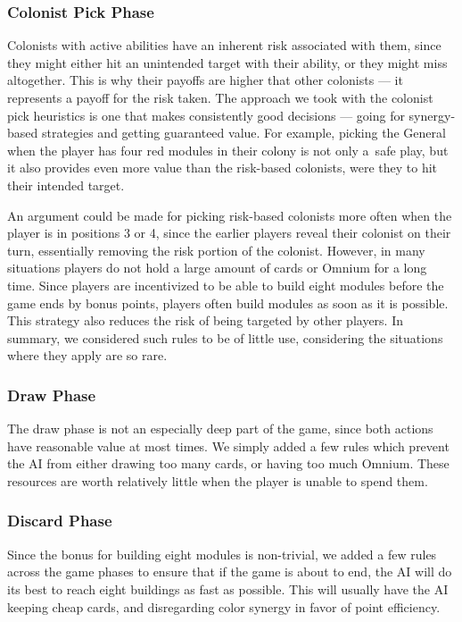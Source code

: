 \subsubsection{Colonist Pick Phase}

Colonists with active abilities have an inherent risk associated with them,
since they might either hit an unintended target with their ability, or they might
miss altogether. This is why their payoffs are higher that other colonists ---
it represents a payoff for the risk taken.
The approach we took with the colonist pick heuristics is one that makes consistently
good decisions --- going for synergy-based strategies and getting guaranteed value.
For example, picking the General when the player has four red modules in their colony
is not only a~safe play, but it also provides even more value than the risk-based
colonists, were they to hit their intended target.

An argument could be made for picking risk-based colonists more often when the player
is in positions 3 or 4, since the earlier players reveal their colonist on their turn,
essentially removing the risk portion of the colonist. However, in many situations players
do not hold a large amount of cards or Omnium for a long time. Since players are incentivized
to be able to build eight modules before the game ends by bonus points, players often
build modules as soon as it is possible. This strategy also reduces the risk of being
targeted by other players. In summary, we considered such rules to be of little use,
considering the situations where they apply are so rare.

\subsubsection{Draw Phase}

The draw phase is not an especially deep part of the game, since both actions have
reasonable value at most times. We simply added a few rules which prevent the AI
from either drawing too many cards, or having too much Omnium. These resources are
worth relatively little when the player is unable to spend them.

\subsubsection{Discard Phase}

Since the bonus for building eight modules is non-trivial, we added a few rules
across the game phases to ensure that if the game is about to end, the AI
will do its best to reach eight buildings as fast as possible. This will usually
have the AI keeping cheap cards, and disregarding color synergy in favor of point
efficiency.

